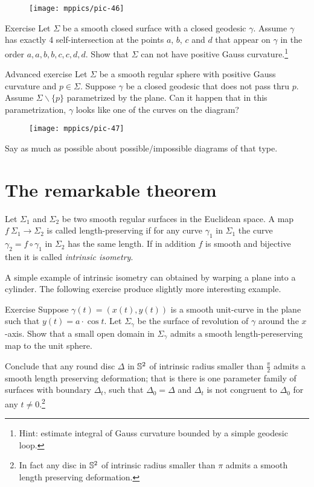 {

\begin{wrapfigure}{o}{32 mm}
\vskip-0mm
\centering
\texttt{[image: mppics/pic-46]}
\vskip-0mm
\end{wrapfigure}

\begin{thm}{Exercise}
Let $\Sigma$ be a smooth closed surface with a closed geodesic $\gamma$.
Assume $\gamma$ has exactly 4 self-intersection at the points $a$, $b$, $c$ and $d$ that appear on $\gamma$ in the order $a,a,b,b,c,c,d,d$.
Show that $\Sigma$ can not have positive Gauss curvature.\footnote{Hint: estimate integral of Gauss curvature bounded by a simple geodesic loop.}
\end{thm}

\begin{thm}{Advanced exercise}
Let $\Sigma$ be a smooth regular sphere with positive Gauss curvature and $p\in\Sigma$. 
Suppose $\gamma$ be a closed geodesic that does not pass thru $p$.
Assume $\Sigma\backslash\{p\}$ parametrized by the plane.
Can it happen that in this parametrization,  $\gamma$ looks like one of the curves on the diagram?
\begin{figure}[h!]
\vskip-0mm
\centering
\texttt{[image: mppics/pic-47]}
\vskip-0mm
\end{figure}
Say as much as possible about possible/impossible diagrams of that type.
\end{thm}

}

\section{The remarkable theorem}

Let $\Sigma_1$ and $\Sigma_2$ be two smooth regular surfaces in the Euclidean space.
A map $f\:\Sigma_1\to \Sigma_2$ is called  length-preserving if for any curve $\gamma_1$ in $\Sigma_1$ the curve $\gamma_2=f\circ\gamma_1$ in $\Sigma_2$ has the same length. %
If in addition $f$ is smooth and bijective then it is called \emph{intrinsic isometry}. 

A simple example of intrinsic isometry can obtained by warping a plane into a cylinder.
The following exercise produce slightly more interesting example.

\begin{thm}{Exercise}
Suppose $\gamma(t)=(x(t),y(t))$ is a smooth unit-curve in the plane such that $y(t)=a\cdot \cos t$.
Let $\Sigma_\gamma$ be the surface of revolution of $\gamma$ around the $x$-axis.
Show that a small open domain in $\Sigma_\gamma$ admits a smooth length-pereserving map to the unit sphere.

Conclude that any round disc $\Delta$ in $\mathbb{S}^2$ of intrinsic radius smaller than $\tfrac\pi2$ admits a smooth length preserving deformation; that is there is one parameter family of surfaces with boundary $\Delta_t$, such that $\Delta_0=\Delta$ and $\Delta_t$ is not congruent to $\Delta_0$ for any $t\ne0$.\footnote{In fact any disc in $\mathbb{S}^2$ of intrinsic radius smaller than $\pi$ admits a smooth length preserving deformation. %
}
\end{thm}



